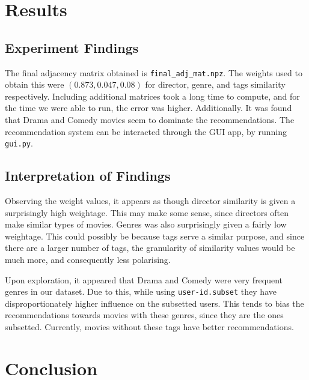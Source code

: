 \documentclass[11pt]{article}
\begin{document}
    \hypertarget{results}{%
\section{Results}\label{results}}

\hypertarget{experiment-findings}{%
\subsection{Experiment Findings}\label{experiment-findings}}

The final adjacency matrix obtained is \texttt{final\_adj\_mat.npz}. The
weights used to obtain this were \((0.873, 0.047, 0.08)\) for director,
genre, and tags similarity respectively. Including additional matrices
took a long time to compute, and for the time we were able to run, the
error was higher. Additionally. It was found that Drama and Comedy
movies seem to dominate the recommendations. The recommendation system
can be interacted through the GUI app, by running \texttt{gui.py}.

\hypertarget{interpretation-of-findings}{%
\subsection{Interpretation of
Findings}\label{interpretation-of-findings}}

Observing the weight values, it appears as though director similarity is
given a surprisingly high weightage. This may make some sense, since
directors often make similar types of movies. Genres was also
surprisingly given a fairly low weightage. This could possibly be
because tags serve a similar purpose, and since there are a larger
number of tags, the granularity of similarity values would be much more,
and consequently less polarising.

Upon exploration, it appeared that Drama and Comedy were very frequent
genres in our dataset. Due to this, while using \texttt{user-id.subset}
they have disproportionately higher influence on the subsetted users.
This tends to bias the recommendations towards movies with these genres,
since they are the ones subsetted. Currently, movies without these tags
have better recommendations.

    \hypertarget{conclusion}{%
\section{Conclusion}\label{conclusion}}
\end{document}
